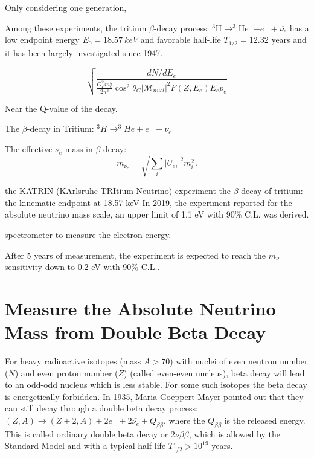  


Only considering one generation,

Among these experiments, the tritium $\beta$-decay process: $^3$H$\to^3$He$^+$+$e^-+\overline{\nu_e}$ has a low endpoint energy $E_0=18.57~keV$ and favorable half-life $T_{1/2}=12.32$ years\cite{aker2019improved} and it has been largely investigated since 1947\cite{fukugita2013physics}.

\begin{equation}
\sqrt{\frac{dN/dE_e}{\frac{G^2_F m_e^5}{2\pi^3}\cos^2\theta_C|\mathcal{M}_{nucl}|^2F(Z,E_e)E_e p_e}}
\end{equation}

Near the Q-value of the decay.


The $\beta$-decay in Tritium: $^3H\to^3He+e^-+\bar{\nu}_e$

The effective $\nu_e$ mass in $\beta$-decay:
\begin{equation}
m_{\bar{\nu}_e} = \sqrt{\sum_i |U_{ei}|^2 m_i^2}.
\end{equation}




the KATRIN (KArlsruhe TRItium Neutrino) experiment
the $\beta$-decay of tritium:
the kinematic endpoint at 18.57 keV
In 2019, the experiment reported 
for the absolute neutrino mass scale,
an upper limit of 1.1 eV with 90\% C.L. was derived.


spectrometer to measure the electron energy.

After 5 years of measurement, the experiment is expected to reach the $m_\nu$ sensitivity down to 0.2 eV with 90\% C.L..

\cite{aker2019improved}

\section{Measure the Absolute Neutrino Mass from Double Beta Decay}

For heavy radioactive isotopes (mass $A>70$) with nuclei of even neutron number ($N$) and even proton number ($Z$) (called even-even nucleus), beta decay will lead to an odd-odd nucleus which is less stable. For some such isotopes the beta decay is energetically forbidden. In 1935, Maria Goeppert-Mayer pointed out that they can still decay through a double beta decay process: $(Z,A) \to (Z+2,A)+2e^{-}+2\bar{\nu_e}+Q_{\beta\beta}$, where the $Q_{\beta\beta}$ is the released energy. This is called ordinary double beta decay or $2\nu\beta\beta$, which is allowed by the Standard Model and with a typical half-life $T_{1/2}>10^{19}$ years\cite{povh2008particles,martin2019nuclear}.

